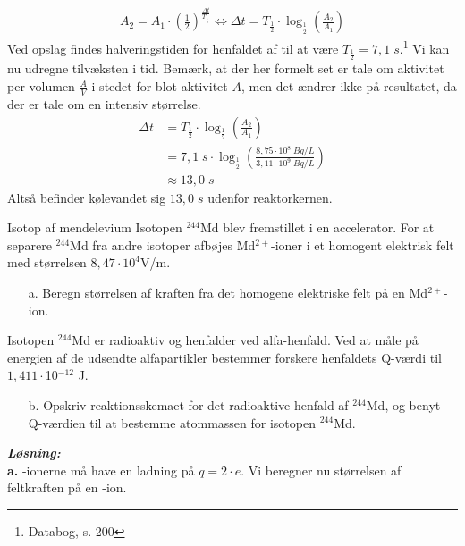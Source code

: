 \documentclass{report}
\newcommand{\sol}{\setlength{\parindent}{0cm}\textbf{\textit{Løsning:}}\setlength{\parindent}{1cm}}
\begin{document}
\begin{equation*}
\begin{split}
  A _{2}=A _{1} \cdot \left(\frac{1}{2}\right) ^{\frac{\Delta t}{T _{\frac{1}{2}}}} \iff  \Delta t = T _{\frac{1}{2}} \cdot \log_{\frac{1}{2}}\left(\frac{A_2}{A_1}\right) 
\end{split}
\end{equation*}
Ved opslag findes halveringstiden for henfaldet af  til at være $T_{\frac{1}{2}}=7,1 \;\unit{s} $.\footnote{Databog, s. 200}
Vi kan nu udregne tilvæksten i tid.
Bemærk, at der her formelt set er tale om aktivitet per volumen $\frac{A}{V}$ i stedet for blot aktivitet $A$, men det ændrer ikke på resultatet, da der er tale om en intensiv størrelse. 
\begin{equation*}
\begin{split}
  \Delta t &= T _{\frac{1}{2}} \cdot \log_{\frac{1}{2}}\left(\frac{A_2}{A_1}\right) \\
  &=7,1 \;\unit{s} \cdot \log_{\frac{1}{2}}\left(\frac{8,75 \cdot 10 ^{8} \;\unit{Bq/L} }{3,11 \cdot 10 ^{9} \;\unit{Bq/L} }\right) \\
  &\approx 13,0 \;\unit{s} 
\end{split}
\end{equation*}
Altså befinder kølevandet sig $13,0 \;\unit{s} $ udenfor reaktorkernen. 
\begin{question}{Isotop af mendelevium}{}
  Isotopen $^{244}$Md blev fremstillet i en accelerator. 
  For at separere $^{244}$Md fra andre isotoper afbøjes Md$^{2+}$-ioner i et homogent elektrisk felt med størrelsen $8,47 \cdot 10^{4}$V/m.
\begin{itemize}
  \item[a.] Beregn størrelsen af kraften fra det homogene elektriske felt på en Md$^{2+}$-ion.
\end{itemize}

Isotopen $^{244}$Md er radioaktiv og henfalder ved alfa-henfald. Ved at måle på energien af de
udsendte alfapartikler bestemmer forskere henfaldets Q-værdi til $1,411\cdot $10$^{-12}$ J.
\begin{itemize}
  \item[b.] Opskriv reaktionsskemaet for det radioaktive henfald af $^{244}$Md, og benyt Q-værdien til at bestemme atommassen for isotopen $^{244}$Md.
\end{itemize}
\end{question}
\sol \\
\textbf{a.}
-ionerne må have en ladning på $q=2 \cdot e$. 
Vi beregner nu størrelsen af feltkraften på en -ion.
\end{document}
